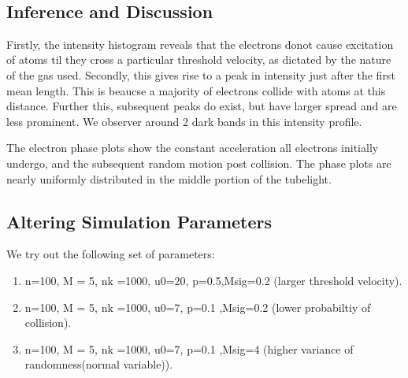 \documentclass[11pt]{article}
\providecommand{\tightlist}{%
      \setlength{\itemsep}{0pt}\setlength{\parskip}{0pt}}
\begin{document}
    \begin{center}
    \end{center}
    { \hspace*{\fill} \\}
    
    \hypertarget{inference-and-discussion}{%
\subsection{Inference and Discussion}\label{inference-and-discussion}}

Firstly, the intensity histogram reveals that the electrons donot cause
excitation of atoms til they cross a particular threshold velocity, as
dictated by the nature of the gas used. Secondly, this gives rise to a
peak in intensity just after the first mean length. This is beaucse a
majority of electrons collide with atoms at this distance. Further this,
subsequent peaks do exist, but have larger spread and are less
prominent. We observer around 2 dark bands in this intensity profile.

The electron phase plots show the constant acceleration all electrons
initially undergo, and the subsequent random motion post collision. The
phase plots are nearly uniformly distributed in the middle portion of
the tubelight.

\hypertarget{altering-simulation-parameters}{%
\subsection{Altering Simulation
Parameters}\label{altering-simulation-parameters}}

We try out the following set of parameters:

\begin{enumerate}
\def\labelenumi{\arabic{enumi}.}
\tightlist
\item
  n=100, M = 5, nk =1000, u0=20, p=0.5,Msig=0.2 (larger threshold
  velocity).
\item
  n=100, M = 5, nk =1000, u0=7, p=0.1 ,Msig=0.2 (lower probabiltiy of
  collision).
\item
  n=100, M = 5, nk =1000, u0=7, p=0.1 ,Msig=4 (higher variance of
  randomness(normal variable)).
\end{enumerate}
\end{document}
